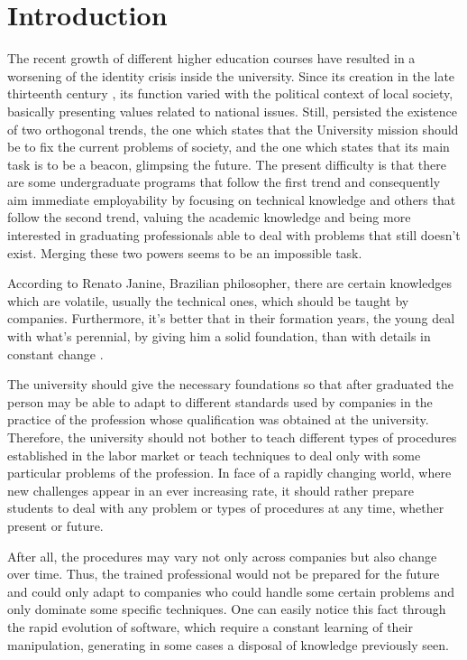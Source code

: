 \documentclass[conference]{IEEEtran}
\begin{document}
\section{Introduction}
	The recent growth of different higher education courses have resulted in a worsening of the identity crisis inside the university. Since its creation in the late thirteenth century \cite{oliveira:origem_universidades}, its function varied with the political context of local society, basically presenting values related to national issues. Still, persisted the existence of two orthogonal trends, the one which states that the University mission should be to fix the current problems of society, and the one which states that its main task is to be a beacon, glimpsing the future. The present difficulty is that there are some undergraduate programs that follow the first trend and consequently aim immediate employability by focusing on technical knowledge and others that follow the second trend, valuing the academic knowledge and being more interested in graduating professionals able to deal with problems that still doesn't exist. Merging these two powers seems to be an impossible task.
	
	According to Renato Janine, Brazilian philosopher, there are certain knowledges which are volatile, usually the technical ones, which should be taught by companies. Furthermore, it's better that in their formation years, the young deal with what's perennial, by giving him a solid foundation, than with details in constant change \cite{ribeiro:universidade_vida_atual}.

	The university should give the necessary foundations so that after graduated the person may be able to adapt to different standards used by companies in the practice of the profession whose qualification was obtained at the university. Therefore, the university should not bother to teach different types of procedures established in the labor market or teach techniques to deal only with some particular problems of the profession. In face of a rapidly changing world, where new challenges appear in an ever increasing rate, it should rather prepare students to deal with any problem or types of procedures at any time, whether present or future.

	After all, the procedures may vary not only across companies but also change over time. Thus, the trained professional would not be prepared for the future and could only adapt to companies who could handle some certain problems and only dominate some specific techniques. One can easily notice this fact through the rapid evolution of software, which require a constant learning of their manipulation, generating in some cases a disposal of knowledge previously seen.
\end{document}
